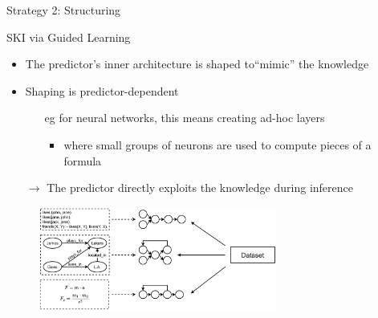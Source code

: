 \documentclass[presentation]{beamer}\mode<presentation>{\usetheme{AMSBolognaFC}}
\begin{document}
\begin{frame}[allowframebreaks]{Strategy 2: Structuring}
    \begin{block}{SKI via Guided Learning}
        \begin{itemize}
            \item The predictor's inner architecture is shaped  to``mimic'' the knowledge
            
            \item Shaping is predictor-dependent
            \begin{itemize}
                \item[eg] for neural networks, this means creating \alert{ad-hoc layers}
                \begin{itemize}
                    \item where small groups of neurons are used to compute pieces of a formula
                \end{itemize}
            \end{itemize}

            \medskip
            
            \item[$\rightarrow$] The predictor directly exploits the knowledge during inference
        \end{itemize}
    \end{block}
    \begin{figure}
        \centering
        \includegraphics[width=0.7\textwidth]{figures/ski-structuring}
    \end{figure}

    \framebreak
    

\end{frame}
\end{document}
